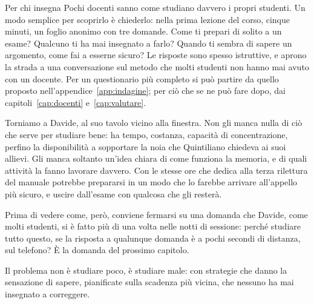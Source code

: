 \begin{riquadro}{Per chi insegna}
Pochi docenti sanno come studiano davvero i propri studenti. Un modo
semplice per scoprirlo è chiederlo: nella prima lezione del corso,
cinque minuti, un foglio anonimo con tre domande. Come ti prepari di
solito a un esame? Qualcuno ti ha mai insegnato a farlo? Quando ti sembra
di sapere un argomento, come fai a esserne sicuro? Le risposte sono
spesso istruttive, e aprono la strada a una conversazione sul metodo
che molti studenti non hanno mai avuto con un docente. Per un
questionario più completo si può partire da quello proposto
nell'appendice~\ref{app:indagine}; per ciò che se ne può fare dopo,
dai capitoli~\ref{cap:docenti} e~\ref{cap:valutare}.
\end{riquadro}

\asterismo

Torniamo a Davide, al suo tavolo vicino alla finestra. Non gli manca
nulla di ciò che serve per studiare bene: ha tempo, costanza, capacità
di concentrazione, perfino la disponibilità a sopportare la noia che
Quintiliano chiedeva ai suoi allievi. Gli manca soltanto un'idea chiara
di come funziona la memoria, e di quali attività la fanno lavorare
davvero. Con le stesse ore che dedica alla terza rilettura del manuale
potrebbe prepararsi in un modo che lo farebbe arrivare all'appello più
sicuro, e uscire dall'esame con qualcosa che gli resterà.

Prima di vedere come, però, conviene fermarsi su una domanda che Davide,
come molti studenti, si è fatto più di una volta nelle notti di
sessione: perché studiare tutto questo, se la risposta a qualunque
domanda è a pochi secondi di distanza, sul telefono? È la domanda del
prossimo capitolo.

\begin{daricordare}
Il problema non è studiare poco, è studiare male: con strategie che danno
la sensazione di sapere, pianificate sulla scadenza più vicina, che
nessuno ha mai insegnato a correggere.
\end{daricordare}

